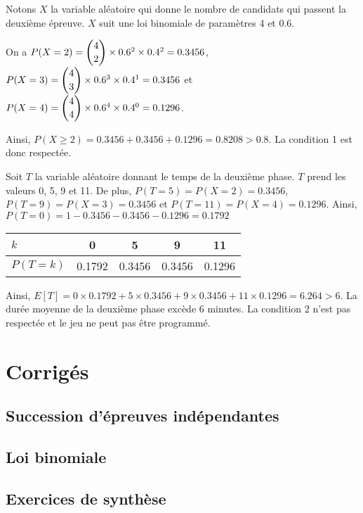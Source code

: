 \documentclass[11pt,fleqn, openany]{book} %
\begin{document}
\begin{solution}
Notons $X$ la variable aléatoire qui donne le nombre de candidats qui passent la deuxième épreuve. $X$ suit une loi binomiale de paramètres 4 et 0.6.

On a $P(X=2)=\dbinom{4}{2} \times 0.6^2 \times 0.4^2 = 0.3456$, $P(X=3)=\dbinom{4}{3} \times 0.6^3 \times 0.4^1 = 0.3456$ et \\$P(X=4)=\dbinom{4}{4} \times 0.6^4 \times 0.4^0 = 0.1296$.

Ainsi, $P(X\geqslant 2)=0.3456+0.3456+0.1296 =0.8208 > 0.8$. La condition 1 est donc respectée. 

Soit $T$ la variable aléatoire donnant le temps de la deuxième phase. $T$ prend les valeurs 0, 5, 9 et 11. De plus, $P(T=5)=P(X=2)=0.3456$, $P(T=9)=P(X=3)=0.3456$ et $P(T=11)=P(X=4)=0.1296$. Ainsi, $P(T=0)=1-0.3456-0.3456-0.1296 = 0.1792$

\begin{center}
\begin{tabular}{|l|c|c|c|c|}
\hline
$k$ & 0& 5& 9& 11\\
\hline 
$P(T=k)$ & 0.1792 & 0.3456 & 0.3456 & 0.1296 \\
\hline
\end{tabular}
\end{center}
Ainsi, $E[T]=0 \times 0.1792 + 5 \times 0.3456 + 9 \times 0.3456 + 11 \times 0.1296 = 6.264 >6$. La durée moyenne de la deuxième phase excède 6 minutes. La condition 2 n'est pas respectée et le jeu ne peut pas être programmé. \end{solution}


\chapter{Corrigés}



\section*{Succession d'épreuves indépendantes}

\printsolutions[collection={prob11}, headings={false} ]

\section*{Loi binomiale}

\printsolutions[collection={prob12}, headings={false} ]
\section*{Exercices de synthèse}


\printsolutions[collection={prob13}, headings={false} ]
\end{document}
